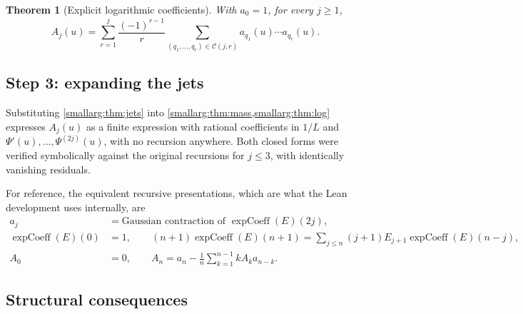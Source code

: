 \documentclass[11pt,oneside]{article}
\newtheorem{theorem}{Theorem}[section]
\theoremstyle{definition}
\theoremstyle{remark}
\begin{document}
\begin{theorem}[Explicit logarithmic coefficients]\label{smallarg:thm:log}
With $a_0=1$, for every $j\ge1$,
\[
  A_j(u)=\sum_{r=1}^{j}\frac{(-1)^{r-1}}{r}
    \sum_{(q_1,\dots,q_r)\in\mathcal C(j,r)}a_{q_1}(u)\cdots a_{q_r}(u).
\]
\end{theorem}

\subsection{Step 3: expanding the jets}

Substituting \cref{smallarg:thm:jets} into \cref{smallarg:thm:mass,smallarg:thm:log} expresses $A_j(u)$ as
a finite expression with rational coefficients in $1/L$ and
$\Psi'(u),\dots,\Psi^{(2j)}(u)$, with no recursion anywhere.  Both closed forms
were verified symbolically against the original recursions for $j\le3$, with
identically vanishing residuals.

For reference, the equivalent recursive presentations, which are what the Lean
development uses internally, are
\[
\begin{aligned}
  a_j&=\text{Gaussian contraction of }\operatorname{expCoeff}(E)(2j),\\
  \operatorname{expCoeff}(E)(0)&=1,\qquad
  (n+1)\operatorname{expCoeff}(E)(n+1)
    =\sum_{j\le n}(j+1)E_{j+1}\operatorname{expCoeff}(E)(n-j),\\
  A_0&=0,\qquad A_n=a_n-\frac1n\sum_{k=1}^{n-1}kA_ka_{n-k}.
\end{aligned}
\]

\subsection{Structural consequences}
\end{document}
